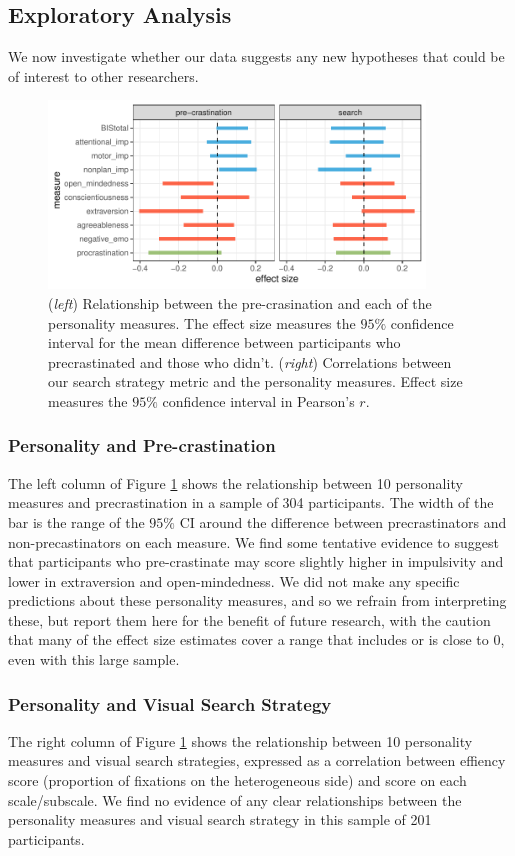 \documentclass[]{rsos}
\begin{document}
\subsection{Exploratory Analysis}

We now investigate whether our data suggests any new hypotheses that could be of interest to other researchers.  

\begin{figure}[t]
  \centering  
\includegraphics[width=10cm]{../analysis/scratch/exp_strat.pdf}
  \caption{(\textit{left}) Relationship between the pre-crasination and each of the personality measures. The effect size measures the $95\%$ confidence interval for the mean difference between participants who precrastinated and those who didn't. (\textit{right}) Correlations between our search strategy metric and the personality measures. Effect size measures the $95\%$ confidence interval in Pearson's $r$.}
   \label{fig:exp_analysis}
\end{figure}

\subsubsection{Personality and Pre-crastination}
The left column of Figure \ref{fig:exp_analysis} shows the relationship between 10 personality measures and precrastination in a sample of 304 participants. The width of the bar is the range of the $95\%$ CI around the difference between precrastinators and non-precastinators on each measure. We find some tentative evidence to suggest that participants who pre-crastinate may score slightly higher in impulsivity and lower in extraversion and open-mindedness. We did not make any specific predictions about these personality measures, and so we refrain from interpreting these, but report them here for the benefit of future research, with the caution that many of the effect size estimates cover a range that includes or is close to 0, even with this large sample.

\subsubsection{Personality and Visual Search Strategy}
The right column of Figure \ref{fig:exp_analysis} shows the relationship between 10 personality measures and visual search strategies, expressed as a correlation between effiency score (proportion of fixations on the heterogeneous side) and score on each scale/subscale.  We find no evidence of any clear relationships between the personality measures and visual search strategy in this sample of 201 participants.
\end{document}
